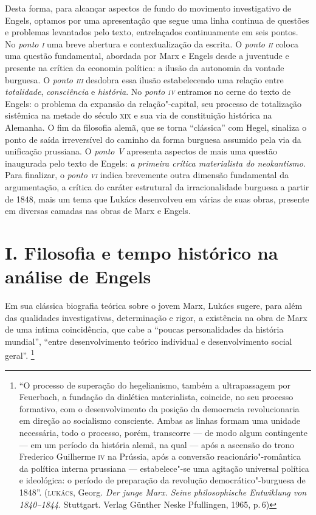 Desta forma, para alcançar aspectos de fundo do movimento investigativo
de Engels, optamos por uma apresentação que segue uma linha continua de
questões e problemas levantados pelo texto, entrelaçados continuamente
em seis pontos. No \emph{ponto \textsc{i}} uma breve abertura e contextualização
da escrita. O \emph{ponto \textsc{ii}} coloca uma questão fundamental, abordada
por Marx e Engels desde a juventude e presente na crítica da economia
política: a ilusão da autonomia da vontade burguesa. O \emph{ponto \textsc{iii}}
desdobra essa ilusão estabelecendo uma relação entre \emph{totalidade},
\emph{consciência} e \emph{história}. No \emph{ponto \textsc{iv}} entramos no
cerne do texto de Engels: o problema da expansão da relação"-capital, seu
processo de totalização sistêmica na metade do século \textsc{xix} e sua via de
constituição histórica na Alemanha. O fim da filosofia alemã, que se
torna ``clássica'' com Hegel, sinaliza o ponto de saída irreversível do
caminho da forma burguesa assumido pela via da unificação prussiana. O
\emph{ponto V} apresenta aspectos de mais uma questão inaugurada pelo
texto de Engels: \emph{a} \emph{primeira crítica materialista do
neokantismo}. Para finalizar, o \emph{ponto \textsc{vi}} indica brevemente outra
dimensão fundamental da argumentação, a crítica do caráter estrutural da
irracionalidade burguesa a partir de 1848, mais um tema que Lukács
desenvolveu em várias de suas obras, presente em diversas camadas nas
obras de Marx e Engels.

\section*{I. Filosofia e tempo histórico na análise de Engels}

Em sua clássica biografia teórica sobre o jovem Marx, Lukács sugere,
para além das qualidades investigativas, determinação e rigor, a
existência na obra de Marx de uma intima coincidência, que cabe a
``poucas personalidades da história mundial'', ``entre desenvolvimento
teórico individual e desenvolvimento social geral''. \footnote{``O
  processo de superação do hegelianismo, também a ultrapassagem por
  Feuerbach, a fundação da dialética materialista, coincide, no seu
  processo formativo, com o desenvolvimento da posição da democracia
  revolucionaria em direção ao socialismo consciente. Ambas as linhas
  formam uma unidade necessária, todo o processo, porém, transcorre --- de
  modo algum contingente --- em um período da história alemã, na qual ---
  após a ascensão do trono Frederico Guilherme \textsc{iv} na Prússia, após a
  conversão reacionário"-romântica da política interna prussiana ---
  estabelece"-se uma agitação universal política e ideológica: o período
  de preparação da revolução democrático"-burguesa de 1848''. (\textsc{lukács},
  Georg. \emph{Der junge Marx. Seine philosophische Entwiklung von
  1840--1844}. Stuttgart. Verlag Günther Neske Pfullingen, 1965, p.\,6)}

